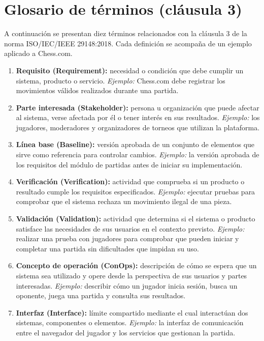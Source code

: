 \documentclass[12pt,a4paper]{article}
\begin{document}
\section{Glosario de términos (cláusula 3)}

A continuación se presentan diez términos relacionados con la cláusula 3 de la norma ISO/IEC/IEEE 29148:2018. Cada definición se acompaña de un ejemplo aplicado a Chess.com.

\begin{enumerate}[leftmargin=*]
    \item \textbf{Requisito (Requirement):} necesidad o condición que debe cumplir un sistema, producto o servicio. \textit{Ejemplo:} Chess.com debe registrar los movimientos válidos realizados durante una partida.
    \item \textbf{Parte interesada (Stakeholder):} persona u organización que puede afectar al sistema, verse afectada por él o tener interés en sus resultados. \textit{Ejemplo:} los jugadores, moderadores y organizadores de torneos que utilizan la plataforma.
    \item \textbf{Línea base (Baseline):} versión aprobada de un conjunto de elementos que sirve como referencia para controlar cambios. \textit{Ejemplo:} la versión aprobada de los requisitos del módulo de partidas antes de iniciar su implementación.
    \item \textbf{Verificación (Verification):} actividad que comprueba si un producto o resultado cumple los requisitos especificados. \textit{Ejemplo:} ejecutar pruebas para comprobar que el sistema rechaza un movimiento ilegal de una pieza.
    \item \textbf{Validación (Validation):} actividad que determina si el sistema o producto satisface las necesidades de sus usuarios en el contexto previsto. \textit{Ejemplo:} realizar una prueba con jugadores para comprobar que pueden iniciar y completar una partida sin dificultades que impidan su uso.
    \item \textbf{Concepto de operación (ConOps):} descripción de cómo se espera que un sistema sea utilizado y opere desde la perspectiva de sus usuarios y partes interesadas. \textit{Ejemplo:} describir cómo un jugador inicia sesión, busca un oponente, juega una partida y consulta sus resultados.
    \item \textbf{Interfaz (Interface):} límite compartido mediante el cual interactúan dos sistemas, componentes o elementos. \textit{Ejemplo:} la interfaz de comunicación entre el navegador del jugador y los servicios que gestionan la partida.

\end{enumerate}
\end{document}

